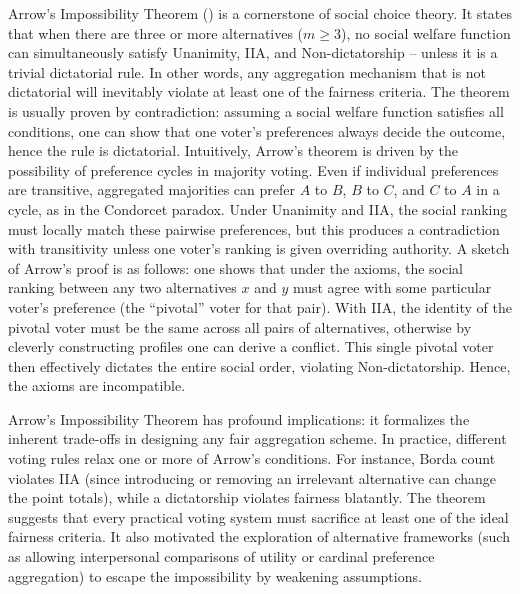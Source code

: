 \documentclass[
  letterpaper,
  numbers=noenddot,
  DIV=11]{scrreprt}
\theoremstyle{plain}
\theoremstyle{definition}
\theoremstyle{remark}
\begin{document}
Arrow's Impossibility Theorem () is
a cornerstone of social choice theory. It states that when there are
three or more alternatives (\(m\ge 3\)), no social welfare function can
simultaneously satisfy Unanimity, IIA, and Non-dictatorship -- unless it
is a trivial dictatorial rule. In other words, any aggregation mechanism
that is not dictatorial will inevitably violate at least one of the
fairness criteria. The theorem is usually proven by contradiction:
assuming a social welfare function satisfies all conditions, one can
show that one voter's preferences always decide the outcome, hence the
rule is dictatorial. Intuitively, Arrow's theorem is driven by the
possibility of preference cycles in majority voting. Even if individual
preferences are transitive, aggregated majorities can prefer \(A\) to
\(B\), \(B\) to \(C\), and \(C\) to \(A\) in a cycle, as in the
Condorcet paradox. Under Unanimity and IIA, the social ranking must
locally match these pairwise preferences, but this produces a
contradiction with transitivity unless one voter's ranking is given
overriding authority. A sketch of Arrow's proof is as follows: one shows
that under the axioms, the social ranking between any two alternatives
\(x\) and \(y\) must agree with some particular voter's preference (the
``pivotal'' voter for that pair). With IIA, the identity of the pivotal
voter must be the same across all pairs of alternatives, otherwise by
cleverly constructing profiles one can derive a conflict. This single
pivotal voter then effectively dictates the entire social order,
violating Non-dictatorship. Hence, the axioms are incompatible.

Arrow's Impossibility Theorem has profound implications: it formalizes
the inherent trade-offs in designing any fair aggregation scheme. In
practice, different voting rules relax one or more of Arrow's
conditions. For instance, Borda count violates IIA (since introducing or
removing an irrelevant alternative can change the point totals), while a
dictatorship violates fairness blatantly. The theorem suggests that
every practical voting system must sacrifice at least one of the ideal
fairness criteria. It also motivated the exploration of alternative
frameworks (such as allowing interpersonal comparisons of utility or
cardinal preference aggregation) to escape the impossibility by
weakening assumptions.
\end{document}
